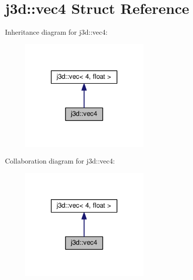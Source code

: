 \hypertarget{structj3d_1_1vec4}{}\section{j3d\+:\+:vec4 Struct Reference}
\label{structj3d_1_1vec4}


Inheritance diagram for j3d\+:\+:vec4\+:
\nopagebreak
\begin{figure}[H]
\begin{center}
\leavevmode
\includegraphics[width=179pt]{structj3d_1_1vec4__inherit__graph}
\end{center}
\end{figure}


Collaboration diagram for j3d\+:\+:vec4\+:
\nopagebreak
\begin{figure}[H]
\begin{center}
\leavevmode
\includegraphics[width=179pt]{structj3d_1_1vec4__coll__graph}
\end{center}
\end{figure}
